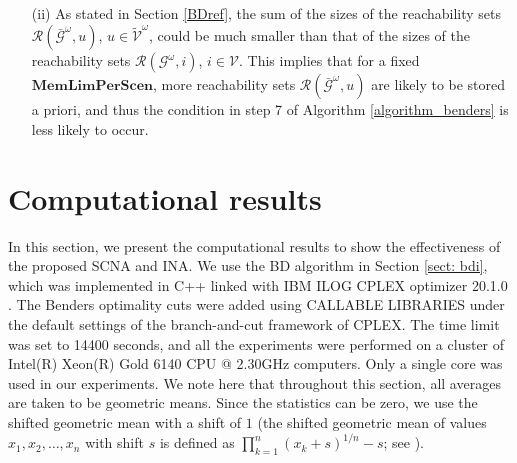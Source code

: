 \documentclass[a4paper,10pt]{article}
\theoremstyle{plain}
\newcommand{\rev}[1]{{\color{black}#1}}
\newcommand{\revv}[1]{{#1}}
\begin{document}
{\begin{itemize}
{\begin{equation}
				|\tilde{\mathcal{V}}^\omega\backslash \mathcal{I}(\bar{\mathcal{G}}^\omega, \mathcal{S}^\omega)|
				\leq \left|\mathcal{V}\backslash \mathcal{I}\left(\mathcal{G}^\omega,\bigcup_{v \in \mathcal{S}^\omega}\mathcal{SC}_v^\omega\right) \right|
				\leq |{\mathcal{V}}\backslash \mathcal{I}({\mathcal{G}}^\omega, \hat{\mathcal{S}}^\omega)|
			\end{equation}
			where the last inequality follows from $\hat{\mathcal{S}}^\omega \subseteq \bigcup_{v \in \mathcal{S}^\omega}\mathcal{SC}_v^\omega$ and the fact that $\mathcal{I}(\mathcal{G}^\omega, \mathcal{S}_1) \subseteq \mathcal{I}(\mathcal{G}^\omega, \mathcal{S}_2)$ for any $ \mathcal{S}_1 \subseteq  \mathcal{S}_2 \subseteq \mathcal{V}$.}
		\item [(ii)] \revv{As stated in Section \ref{BDref}, the sum of the sizes of the reachability sets $\mathcal{R}(\bar{\mathcal{G}}^\omega,u)$, $u \in \tilde{\mathcal{V}}^\omega$, could be much smaller than that of the sizes of the reachability sets $\mathcal{R}({\mathcal{G}}^\omega,i)$, $i \in \mathcal{V}$.
			This implies that for a fixed $\mathbf{MemLimPerScen}$, more reachability sets $\mathcal{R}(\bar{\mathcal{G}}^\omega,u)$ are likely to be stored a priori, and thus the condition in step 7 of Algorithm \ref{algorithm_benders} is less likely to occur.  }
	\end{itemize}

	
	\section{Computational results}\label{sect: CR}
	In this section, we present the computational results to show the effectiveness of the proposed SCNA and INA.
	We use the BD algorithm in \revv{Section} \ref{sect: bdi}, which \revv{was} implemented in C++ linked with IBM ILOG CPLEX optimizer 20.1.0 \cite{Cplex}.
	The Benders \revv{optimality} cuts \revv{were} added using CALLABLE LIBRARIES under the default settings of the branch-and-cut framework of CPLEX.
	The time limit \revv{was} set to 14400 seconds, and all the experiments were performed on a cluster of Intel(R) Xeon(R) Gold 6140 CPU @ 2.30GHz computers.
	Only a single core was used in our experiments.
	\rev{We note here that throughout this section,
		all averages are taken to be geometric means.
		Since the statistics can be zero, we use the shifted geometric mean with a
		shift of $1$ (the shifted geometric mean of values $x_1, x_2,\ldots,x_n$ with shift $s$ is defined as
		$\prod_{k=1}^n(x_k + s)^{1/n} - s$; see \cite{Achterberg2007}).}
}
\end{document}
